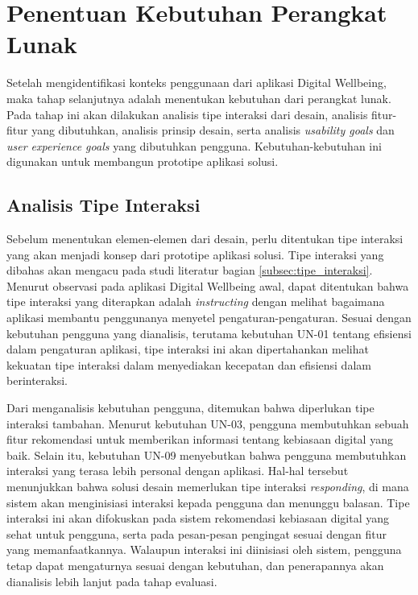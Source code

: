 \newcommand{\cccnormspacing}{\baselineskip=12pt}
\newcommand{\cccnormspacingcenter}{\centering\arraybackslash\cccnormspacing}


\section{Penentuan Kebutuhan Perangkat Lunak}

Setelah mengidentifikasi konteks penggunaan dari aplikasi Digital Wellbeing, maka tahap selanjutnya adalah menentukan kebutuhan dari perangkat lunak. Pada tahap ini akan dilakukan analisis tipe interaksi dari desain, analisis fitur-fitur yang dibutuhkan, analisis prinsip desain, serta analisis \textit{usability goals} dan \textit{user experience goals} yang dibutuhkan pengguna. Kebutuhan-kebutuhan ini digunakan untuk membangun prototipe aplikasi solusi.

\subsection{Analisis Tipe Interaksi}

Sebelum menentukan elemen-elemen dari desain, perlu ditentukan tipe interaksi yang akan menjadi konsep dari prototipe aplikasi solusi. Tipe interaksi yang dibahas akan mengacu pada studi literatur bagian \ref{subsec:tipe_interaksi}. Menurut observasi pada aplikasi Digital Wellbeing awal, dapat ditentukan bahwa tipe interaksi yang diterapkan adalah \textit{instructing} dengan melihat bagaimana aplikasi membantu penggunanya menyetel pengaturan-pengaturan. Sesuai dengan kebutuhan pengguna yang dianalisis, terutama kebutuhan UN-01 tentang efisiensi dalam pengaturan aplikasi, tipe interaksi ini akan dipertahankan melihat kekuatan tipe interaksi dalam menyediakan kecepatan dan efisiensi dalam berinteraksi.

Dari menganalisis kebutuhan pengguna, ditemukan bahwa diperlukan tipe interaksi tambahan. Menurut kebutuhan UN-03, pengguna membutuhkan sebuah fitur rekomendasi untuk memberikan informasi tentang kebiasaan digital yang baik. Selain itu, kebutuhan UN-09 menyebutkan bahwa pengguna membutuhkan interaksi yang terasa lebih personal dengan aplikasi. Hal-hal tersebut menunjukkan bahwa solusi desain memerlukan tipe interaksi \textit{responding}, di mana sistem akan menginisiasi interaksi kepada pengguna dan menunggu balasan. Tipe interaksi ini akan difokuskan pada sistem rekomendasi kebiasaan digital yang sehat untuk pengguna, serta pada pesan-pesan pengingat sesuai dengan fitur yang memanfaatkannya. Walaupun interaksi ini diinisiasi oleh sistem, pengguna tetap dapat mengaturnya sesuai dengan kebutuhan, dan penerapannya akan dianalisis lebih lanjut pada tahap evaluasi.

